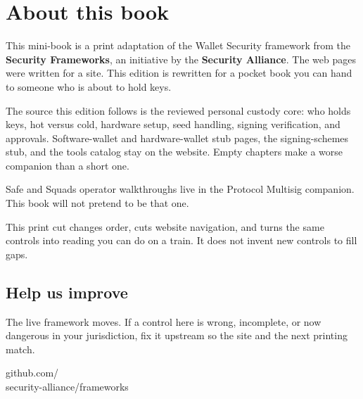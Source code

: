 \chapter{About this book}

This mini-book is a print adaptation of the Wallet
Security framework from the \textbf{Security Frameworks},
an initiative by the \textbf{Security Alliance}. The web
pages were written for a site. This edition is rewritten
for a pocket book you can hand to someone who is about
to hold keys.

The source this edition follows is the reviewed personal
custody core: who holds keys, hot versus cold, hardware
setup, seed handling, signing verification, and
approvals. Software-wallet and hardware-wallet stub
pages, the signing-schemes stub, and the tools catalog
stay on the website. Empty chapters make a worse
companion than a short one.

Safe and Squads operator walkthroughs live in the
Protocol Multisig companion. This book will not pretend
to be that one.

This print cut changes order, cuts website navigation,
and turns the same controls into reading you can do on a
train. It does not invent new controls to fill gaps.

\section{Help us improve}

The live framework moves. If a control here is wrong,
incomplete, or now dangerous in your jurisdiction, fix it
upstream so the site and the next printing match.

{\ttfamily github.com/\\security-alliance/frameworks}



